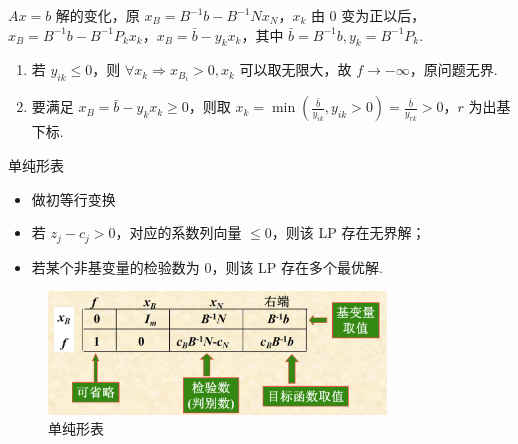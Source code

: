 \begin{note}
\begin{itemize}
            $Ax = b$ 解的变化，原 $x_B = B^{-1}b - B^{-1}Nx_N$，$x_k$ 由 0 变为正以后，$x_B = B^{-1}b - B^{-1}P_kx_k$，$x_B = \bar{b}-y_{k} x_{k}$，其中 $\bar{b} = B^{-1}b,y_k = B^{-1}P_k$.
            \begin{enumerate}
                \item 若 $y_{ik}\le 0$，则 $\forall x_k \Longrightarrow x_{B_i} > 0,x_k$ 可以取无限大，故 $f\to -\infty$，原问题无界.
                \item 要满足 $x_B = \bar{b}-y_{k} x_{k} \ge 0$，则取 $x_k = \min(\frac{\bar{b}}{y_{ik}},y_{ik}>0) = \frac{\bar{b}}{y_{rk}} > 0$，$r$ 为出基下标.
            \end{enumerate}
    \end{itemize}
\end{note}

\begin{note}
    单纯形表
    \begin{itemize}
        \item 做初等行变换
        \item 若 $z_j - c_j > 0$，对应的系数列向量 $\le 0$，则该 LP 存在无界解；
        \item 若某个非基变量的检验数为 0，则该 LP 存在多个最优解.
    \end{itemize}
    \begin{figure}[htbp]
        \centering
        \includegraphics[width=0.8\textwidth]{./figures/img1.png}
        \caption{单纯形表 \label{fig1}}
    \end{figure}
\end{note}

